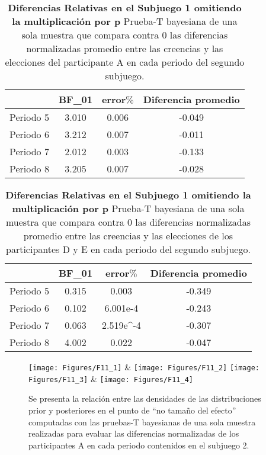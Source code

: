 \begin{table}[h]
\caption[Subjuego 2. Diferencias normalizadas. Participante A.]{\textbf{Diferencias Relativas en el Subjuego 1 omitiendo la multiplicación por p} Prueba-T bayesiana de una sola muestra que compara contra 0 las diferencias normalizadas promedio entre las creencias y las elecciones del participante A en cada periodo del segundo subjuego.}
\label{DN-S2-A-B}
\centering
\begin{tabular}{l | c c | c}
\toprule
\textbf{} & \textbf{BF_01} & \textbf{error$\%$} & \textbf{Diferencia promedio}\\
\midrule
Periodo 5 & 3.010 & 0.006 & -0.049\\
Periodo 6 & 3.212 & 0.007 & -0.011\\
Periodo 7 & 2.012 & 0.003 & -0.133\\
Periodo 8 & 3.205 & 0.007 & -0.028\\
\bottomrule
\end{tabular}
\end{table}

\begin{table}[h]
\caption[Subjuego 2. Diferencias normalizadas. Participante D y E.]{\textbf{Diferencias Relativas en el Subjuego 1 omitiendo la multiplicación por p} Prueba-T bayesiana de una sola muestra que compara contra 0 las diferencias normalizadas promedio entre las creencias y las elecciones de los participantes D y E en cada periodo del segundo subjuego.}
\label{DN-S2-DyE-B}
\centering
\begin{tabular}{l | c c | c}
\toprule
\textbf{} & \textbf{BF_01} & \textbf{error$\%$} & \textbf{Diferencia promedio}\\
\midrule
Periodo 5 & 0.315 & 0.003 & -0.349\\
Periodo 6 & 0.102 & 6.001e-4 & -0.243\\
Periodo 7 & 0.063 & 2.519e^-4 & -0.307\\
Periodo 8 & 4.002 & 0.022 & -0.047\\
\bottomrule
\end{tabular}
\end{table}
  

\begin{figure}[hp]
\centering
\texttt{[image: Figures/F11\_1]} & \texttt{[image: Figures/F11\_2]} 
\texttt{[image: Figures/F11\_3]} & \texttt{[image: Figures/F11\_4]} 
\decoRule
\caption[Evaluación de las Diferencias Relativas entre creencias y elecciones en el Subjuego 1 sin la multiplicación por p (Factor de Bayes)]{Se presenta la relación entre las densidades de las distribuciones prior y posteriores en el punto de “no tamaño del efecto” computadas con las pruebas-T bayesianas de una sola muestra realizadas para evaluar las diferencias normalizadas de los participantes A en cada periodo contenidos en el subjuego 2.}
\label{fig:DN_S2_A}
\end{figure}  


